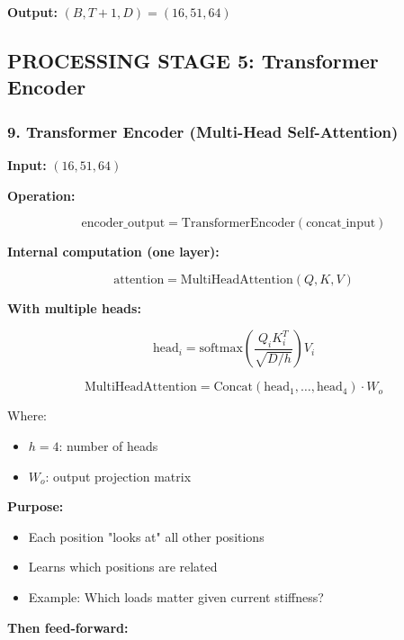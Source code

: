 \documentclass[11pt,a4paper]{article}
\begin{document}
\textbf{Output:} $(B, T+1, D) = (16, 51, 64)$

\subsection{PROCESSING STAGE 5: Transformer Encoder}

\subsubsection{9. Transformer Encoder (Multi-Head Self-Attention)}

\textbf{Input:} $(16, 51, 64)$

\textbf{Operation:}

\begin{equation}
\text{encoder\_output} = \text{TransformerEncoder}(\text{concat\_input})
\end{equation}

\textbf{Internal computation (one layer):}

\begin{equation}
\text{attention} = \text{MultiHeadAttention}(Q, K, V)
\end{equation}

\textbf{With multiple heads:}

\begin{equation}
\text{head}_i = \text{softmax}\left(\frac{Q_i K_i^T}{\sqrt{D/h}}\right) V_i
\end{equation}

\begin{equation}
\text{MultiHeadAttention} = \text{Concat}(\text{head}_1, \ldots, \text{head}_4) \cdot W_o
\end{equation}

Where:
\begin{itemize}
  \item $h = 4$: number of heads
  \item $W_o$: output projection matrix
\end{itemize}

\textbf{Purpose:}
\begin{itemize}
  \item Each position "looks at" all other positions
  \item Learns which positions are related
  \item Example: Which loads matter given current stiffness?
\end{itemize}

\textbf{Then feed-forward:}
\end{document}
